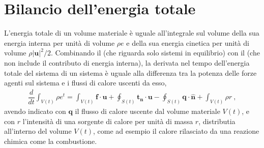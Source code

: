 \documentclass[letterpaper,10pt,italian]{jupyterBook}
\begin{document}
\section{Bilancio dell’energia totale}
\label{\detokenize{polimi/fluidmechanics-ita/template/capitoli/04_bilanci/04teoria:bilancio-dell-energia-totale}}
\sphinxAtStartPar
L’energia totale di un volume materiale è uguale all’integrale sul
volume della sua energia interna per unità di volume \(\rho e\) e della
sua energia cinetica per unità di volume \(\rho |\mathbf{u}|^2/2\). Combinando
il  (che riguarda solo sistemi in
equilibrio) con il  (che non include il
contributo di energia interna), la derivata nel tempo dell’energia
totale del sistema di un sistema è uguale alla differenza tra la potenza
delle forze agenti sul sistema e i flussi di calore uscenti da esso,
\begin{equation*}
\begin{split}\dfrac{d}{dt} \int_{V(t)} \rho e^t = \int_{V(t)} \mathbf{f} \cdot \mathbf{u} + \oint_{S(t)} \mathbf{t_n} \cdot \mathbf{u} - \oint_{S(t)} \mathbf{q} \cdot \mathbf{\hat{n}} + \int_{V(t)} \rho r \ ,\end{split}
\end{equation*}
\sphinxAtStartPar
avendo indicato con \(\mathbf{q}\) il flusso di calore uscente dal volume
materiale \(V(t)\), e con \(r\) l’intensità di una sorgente di calore per
unità di massa \(r\), distributia all’interno del volume \(V(t)\), come ad
esempio il calore rilasciato da una reazione chimica come la
combustione.
\end{document}
